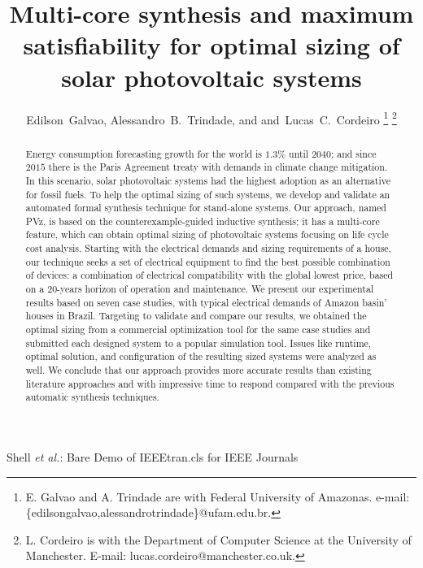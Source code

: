 \documentclass[journal]{IEEEtran}
\begin{document}
\title{Multi-core synthesis and maximum satisfiability for optimal sizing of solar photovoltaic systems}

\author{Edilson~Galvao,%
         Alessandro~B.~Trindade, and%
        and~Lucas~C.~Cordeiro%
\thanks{E. Galvao and A. Trindade are with Federal University of Amazonas. e-mail: \{edilsongalvao,alessandrotrindade\}@ufam.edu.br.}%
\thanks{L. Cordeiro is with the Department of Computer Science at the University of Manchester. E-mail: lucas.cordeiro@manchester.co.uk.}%
}

%
{Shell \MakeLowercase{\textit{et al.}}: Bare Demo of IEEEtran.cls for IEEE Journals}

\maketitle

\begin{abstract}
Energy consumption forecasting growth for the world is $1.3$\% until $2040$; and since $2015$ there is the Paris Agreement treaty with demands in climate change mitigation. In this scenario, solar photovoltaic systems had the highest adoption as an alternative for fossil fuels. To help the optimal sizing of such systems, we develop and validate an automated formal synthesis technique for stand-alone systems. Our approach, named PVz, is based on the counterexample-guided inductive synthesis; it has a multi-core feature, which can obtain optimal sizing of photovoltaic systems focusing on life cycle cost analysis. Starting with the electrical demands and sizing requirements of a house, our technique seeks a set of electrical equipment to find the best possible combination of devices: a combination of electrical compatibility with the global lowest price, based on a 20-years horizon of operation and maintenance. We present our experimental results based on seven case studies, with typical electrical demands of Amazon basin' houses in Brazil. Targeting to validate and compare our results, we obtained the optimal sizing from a commercial optimization tool for the same case studies and submitted each designed system to a popular simulation tool. Issues like runtime, optimal solution, and configuration of the resulting sized systems were analyzed as well. We conclude that our approach provides more accurate results than existing literature approaches and with impressive time to respond compared with the previous automatic synthesis techniques.
\end{abstract}
\end{document}
